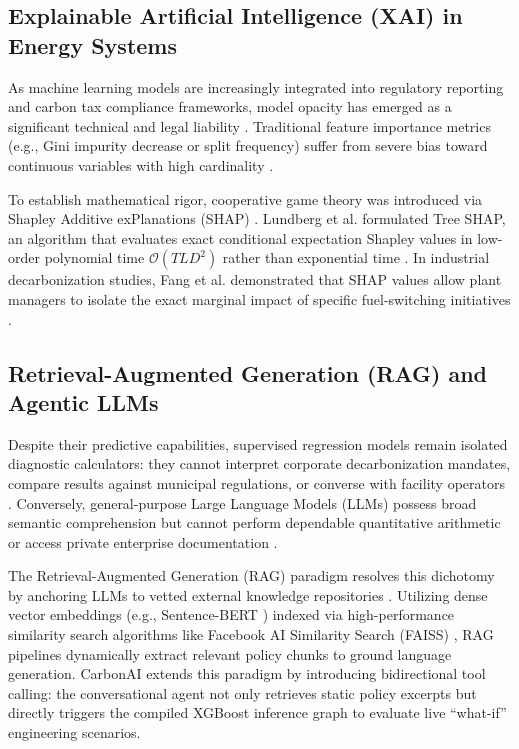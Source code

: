 \documentclass[conference]{IEEEtran}
\begin{document}
\subsection{Explainable Artificial Intelligence (XAI) in Energy Systems}
As machine learning models are increasingly integrated into regulatory reporting and carbon tax compliance frameworks, model opacity has emerged as a significant technical and legal liability \cite{wu2025carbonquant}. Traditional feature importance metrics (e.g., Gini impurity decrease or split frequency) suffer from severe bias toward continuous variables with high cardinality \cite{molnar2022interpretable}.

To establish mathematical rigor, cooperative game theory was introduced via Shapley Additive exPlanations (SHAP) \cite{lundberg2017unified}. Lundberg et al. formulated Tree SHAP, an algorithm that evaluates exact conditional expectation Shapley values in low-order polynomial time $\mathcal{O}(TLD^2)$ rather than exponential time \cite{lundberg2020nature}. In industrial decarbonization studies, Fang et al. demonstrated that SHAP values allow plant managers to isolate the exact marginal impact of specific fuel-switching initiatives \cite{fang2023energy}.

\subsection{Retrieval-Augmented Generation (RAG) and Agentic LLMs}
Despite their predictive capabilities, supervised regression models remain isolated diagnostic calculators: they cannot interpret corporate decarbonization mandates, compare results against municipal regulations, or converse with facility operators \cite{gao2023ragreview}. Conversely, general-purpose Large Language Models (LLMs) \cite{vaswani2017attention} possess broad semantic comprehension but cannot perform dependable quantitative arithmetic or access private enterprise documentation \cite{lewis2020rag}.

The Retrieval-Augmented Generation (RAG) paradigm resolves this dichotomy by anchoring LLMs to vetted external knowledge repositories \cite{lewis2020rag}. Utilizing dense vector embeddings (e.g., Sentence-BERT \cite{reimers2019sentence}) indexed via high-performance similarity search algorithms like Facebook AI Similarity Search (FAISS) \cite{johnson2021faiss}, RAG pipelines dynamically extract relevant policy chunks to ground language generation. CarbonAI extends this paradigm by introducing bidirectional tool calling: the conversational agent not only retrieves static policy excerpts but directly triggers the compiled XGBoost inference graph to evaluate live ``what-if'' engineering scenarios.
\end{document}
